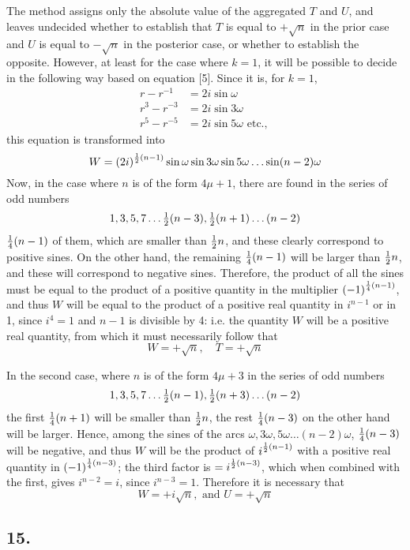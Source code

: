 \documentclass[twoside,12pt, showframe]{memoir}
\let\oldfrac\frac
\def\frac#1#2{\mathchoice{\tfrac{#1}{#2}}{\oldfrac{#1}{#2}}{\genfrac{}{}{}{2}{#1}{#2\mathstrut}}{\genfrac{}{}{}{3}{#1}{#2\mathstrut}}}
\begin{document}
The method assigns only the absolute value of the aggregated \(T\) and \(U\), and leaves undecided whether to establish that \(T\) is equal to \(+\sqrt{n}\) in the prior case and \(U\) is equal to \(-\sqrt{n}\) in the posterior case, or whether to establish the opposite. However, at least for the case where \(k=1\), it will be possible to decide in the following way based on equation [5]. Since it is, for \(k=1\),
\[\begin{aligned}
r-r^{-1} & =2 i \sin \omega \\
r^{3}-r^{-3} & =2 i \sin 3 \omega \\
r^{5}-r^{-5} & =2 i \sin 5 \omega \text{ etc., }
\end{aligned}\]
this equation is transformed into
\[W=(2 i)^{\frac{1}{2}(n-1)} \sin \omega \sin 3 \omega \sin 5 \omega \ldots \sin (n-2) \omega\]
Now, in the case where \(n\) is of the form \(4 \mu+1\), there are found in the series of odd numbers
\[1,3,5,7 \ldots \frac{1}{2}(n-3), \frac{1}{2}(n+1) \ldots(n-2)\]
\(\frac{1}{4}(n-1)\) of them, which are smaller than \(\frac{1}{2} n\), and these clearly correspond to positive sines. On the other hand, the remaining \(\frac{1}{4}(n-1)\) will be larger than \(\frac{1}{2} n\), and these will correspond to negative sines. Therefore, the product of all the sines must be equal to the product of a positive quantity in the multiplier \((-1)^{\frac{1}{4}(n-1)}\), and thus \(W\) will be equal to the product of a positive real quantity in \(i^{n-1}\) or in 1, since \(i^{4}=1\) and \(n-1\) is divisible by 4: i.e. the quantity \(W\) will be a positive real quantity, from which it must necessarily follow that
\[W=+\sqrt{n}, \quad T=+\sqrt{n}\]
%

In the second case, where \(n\) is of the form \(4 \mu+3\) in the series of odd numbers
\[1,3,5,7 \ldots \frac{1}{2}(n-1), \frac{1}{2}(n+3) \ldots(n-2)\]
the first \(\frac{1}{4}(n+1)\) will be smaller than \(\frac{1}{2} n\), the rest \(\frac{1}{4}(n-3)\) on the other hand will be larger. Hence, among the sines of the arcs \(\omega, 3 \omega, 5 \omega \ldots(n-2) \omega\), \(\frac{1}{4}(n-3)\) will be negative, and thus \(W\) will be the product of \(i^{\frac{1}{2}(n-1)}\) with a positive real quantity in \((-1)^{\frac{1}{4}(n-3)}\); the third factor is \(=i^{\frac{1}{2}(n-3)}\), which when combined with the first, gives \(i^{n-2}=i\), since \(i^{n-3}=1\). Therefore it is necessary that
\[W=+i \sqrt{n}, \text{ and } U=+\sqrt{n}\]
%

\subsection*{15.}
\end{document}
